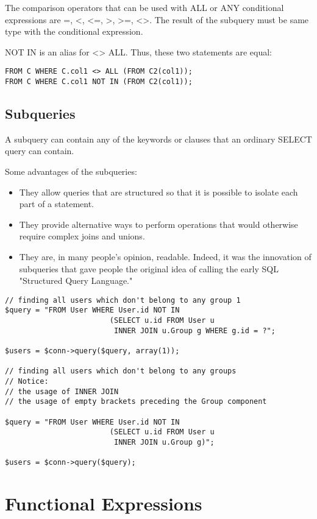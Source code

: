 \documentclass[11pt,a4paper]{report}
\begin{document}
The comparison operators that can be used with ALL or ANY conditional expressions are =, <, <=, >, >=, <>. The result of the subquery must be same type with the conditional expression.

NOT IN is an alias for <> ALL. Thus, these two statements are equal:

\begin{verbatim}
FROM C WHERE C.col1 <> ALL (FROM C2(col1));
FROM C WHERE C.col1 NOT IN (FROM C2(col1));
\end{verbatim}

\subsection{Subqueries}
A subquery can contain any of the keywords or clauses that an ordinary SELECT query can contain.

Some advantages of the subqueries:

\begin{itemize}
\item{They allow queries that are structured so that it is possible to isolate each part of a statement.}
\item{They provide alternative ways to perform operations that would otherwise require complex joins and unions.}
\item{They are, in many people's opinion, readable. Indeed, it was the innovation of subqueries that gave people the original idea of calling the early SQL "Structured Query Language."}
\end{itemize}
\begin{verbatim}
// finding all users which don't belong to any group 1
$query = "FROM User WHERE User.id NOT IN
                        (SELECT u.id FROM User u
                         INNER JOIN u.Group g WHERE g.id = ?";

$users = $conn->query($query, array(1));

// finding all users which don't belong to any groups
// Notice:
// the usage of INNER JOIN
// the usage of empty brackets preceding the Group component

$query = "FROM User WHERE User.id NOT IN
                        (SELECT u.id FROM User u
                         INNER JOIN u.Group g)";

$users = $conn->query($query);
\end{verbatim}

\section{Functional Expressions}
\end{document}
